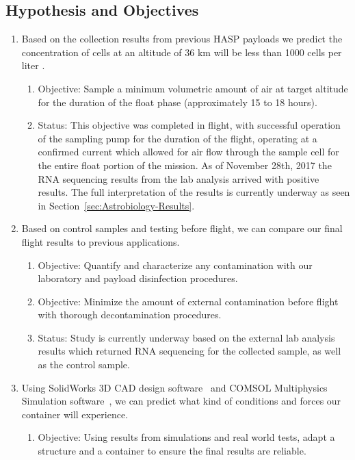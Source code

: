 \subsection{Hypothesis and Objectives}
\label{subsec:Hypothesis and Objectives}
\begin{enumerate}
\item Based on the collection results from previous HASP payloads we predict the concentration of cells at an altitude of 36 km will be less than 1000 cells per liter \citep{LSU}.
	\begin{enumerate}
	\item Objective: Sample a minimum volumetric amount of air at target altitude for the duration of the float phase (approximately 15 to 18 hours).
	\item Status: This objective was completed in flight, with successful operation of the sampling pump for the duration of the flight, operating at a confirmed current which allowed for air flow through the sample cell for the entire float portion of the mission.  As of November 28th, 2017 the RNA sequencing results from the lab analysis arrived with positive results.  The full interpretation of the results is currently underway as seen in Section~\ref{sec:Astrobiology-Results}.
	\end{enumerate}
\item Based on control samples and testing before flight, we can compare our final flight results to previous applications.
	\begin{enumerate}
	\item Objective: Quantify and characterize any contamination with our laboratory and payload disinfection procedures.
	\item Objective: Minimize the amount of external contamination before flight with thorough decontamination procedures.
	\item Status: Study is currently underway based on the external lab analysis results which returned RNA sequencing for the collected sample, as well as the control sample.
	\end{enumerate}
\item Using SolidWorks 3D CAD design software~\cite{Solidworks} and COMSOL Multiphysics Simulation software~\cite{COMSOL}, we can predict what kind of conditions and forces our container will experience.
	\begin{enumerate}
	\item Objective: Using results from simulations and real world tests, adapt a structure and a container to ensure the final results are reliable.

\end{enumerate}
\end{enumerate}
